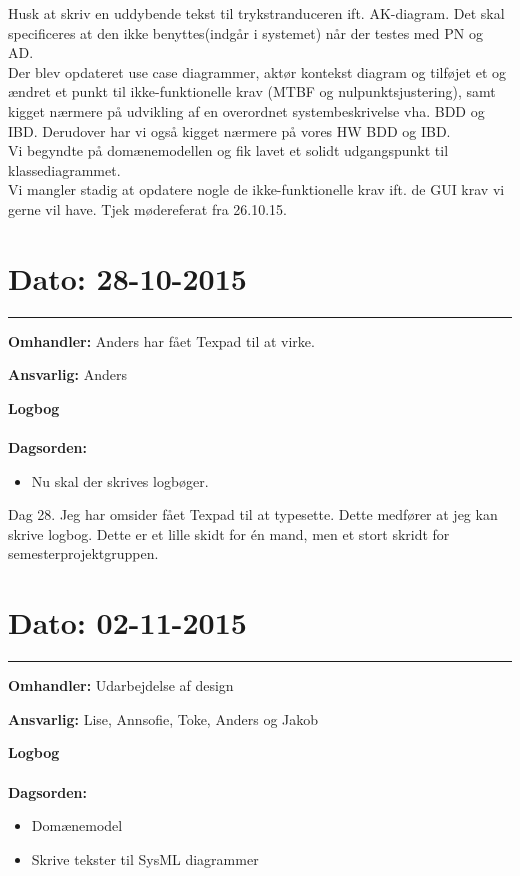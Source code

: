 Husk at skriv en uddybende tekst til trykstranduceren ift. AK-diagram. Det skal specificeres at den ikke benyttes(indgår i systemet) når der testes med PN og AD.
\\
Der blev opdateret use case diagrammer, aktør kontekst diagram og tilføjet et og ændret et punkt til ikke-funktionelle krav (MTBF og nulpunktsjustering), samt kigget nærmere på udvikling af en overordnet systembeskrivelse vha. BDD og IBD. Derudover har vi også kigget nærmere på vores HW BDD og IBD.
\\
Vi begyndte på domænemodellen og fik lavet et solidt udgangspunkt til klassediagrammet. 
\\
Vi mangler stadig at opdatere nogle de ikke-funktionelle krav ift. de GUI krav vi gerne vil have. Tjek mødereferat fra 26.10.15.




\section{Dato: 28-10-2015 }
\hrule

\textbf{Omhandler:} Anders har fået Texpad til at virke. 

\textbf{Ansvarlig:} Anders
 
\textbf{Logbog}
\\
\\
\textbf{Dagsorden:}
\begin{itemize}
	\item Nu skal der skrives logbøger.
\end{itemize} 

Dag 28. Jeg har omsider fået Texpad til at typesette. Dette medfører at jeg kan skrive logbog. Dette er et lille skidt for én mand, men et stort skridt for semesterprojektgruppen.




\section{Dato: 02-11-2015 }
\hrule

\textbf{Omhandler:} Udarbejdelse af design  

\textbf{Ansvarlig:} Lise, Annsofie, Toke, Anders og Jakob

\textbf{Logbog}
\\
\\
\textbf{Dagsorden:}
\begin{itemize}
	\item Domænemodel
	\item Skrive tekster til SysML diagrammer
\end{itemize}

